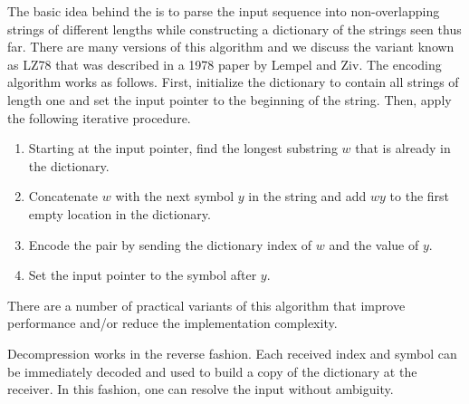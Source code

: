 The basic idea behind the  is to parse the input sequence into non-overlapping strings of different lengths while constructing a dictionary of the strings seen thus far.
There are many versions of this algorithm and we discuss the variant known as LZ78 that was described in a 1978 paper by Lempel and Ziv.
The encoding algorithm works as follows.
First, initialize the dictionary to contain all strings of length one and set the input pointer to the beginning of the string.
Then, apply the following iterative procedure.
\begin{enumerate}
\item Starting at the input pointer, find the longest substring $w$ that is already in the dictionary.
\item Concatenate $w$ with the next symbol $y$ in the string and add $wy$ to the first empty location in the dictionary.
\item Encode the pair by sending the dictionary index of $w$ and the value of $y$.
\item Set the input pointer to the symbol after $y$.
\end{enumerate}
There are a number of practical variants of this algorithm that improve performance and/or reduce the implementation complexity.

Decompression works in the reverse fashion.
Each received index and symbol can be immediately decoded and used to build a copy of the dictionary at the receiver.
In this fashion, one can resolve the input without ambiguity.

